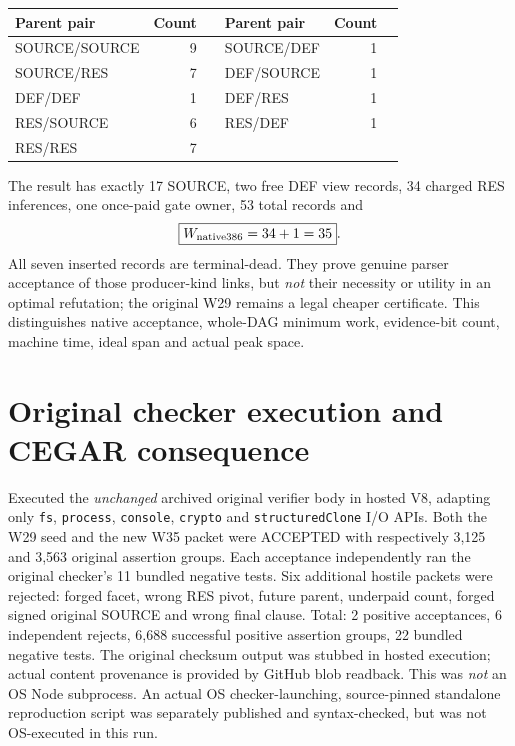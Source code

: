 \documentclass[11pt]{article}
\begin{document}
\begin{center}
\begin{tabular}{lrr@{\qquad}lrr}\toprule
Parent pair & Count & & Parent pair & Count &\\\midrule
SOURCE/SOURCE &9 && SOURCE/DEF &1&\\
SOURCE/RES &7 && DEF/SOURCE &1&\\
DEF/DEF &1 && DEF/RES &1&\\
RES/SOURCE &6 && RES/DEF &1&\\
RES/RES &7 &&&\\\bottomrule
\end{tabular}
\end{center}

The result has exactly 17 SOURCE, two free DEF view records, 34 charged RES inferences, one once-paid gate owner, 53 total records and
\[
\boxed{W_{\rm native386}=34+1=35}.
\]
All seven inserted records are terminal-dead. They prove genuine parser acceptance of those producer-kind links, but \emph{not} their necessity or utility in an optimal refutation; the original W29 remains a legal cheaper certificate. This distinguishes native acceptance, whole-DAG minimum work, evidence-bit count, machine time, ideal span and actual peak space.

\section*{Original checker execution and CEGAR consequence}
Executed the \emph{unchanged} archived original verifier body in hosted V8, adapting only \texttt{fs}, \texttt{process}, \texttt{console}, \texttt{crypto} and \texttt{structuredClone} I/O APIs. Both the W29 seed and the new W35 packet were ACCEPTED with respectively 3,125 and 3,563 original assertion groups. Each acceptance independently ran the original checker's 11 bundled negative tests. Six additional hostile packets were rejected: forged facet, wrong RES pivot, future parent, underpaid count, forged signed original SOURCE and wrong final clause. Total: 2 positive acceptances, 6 independent rejects, 6,688 successful positive assertion groups, 22 bundled negative tests. The original checksum output was stubbed in hosted execution; actual content provenance is provided by GitHub blob readback. This was \emph{not} an OS Node subprocess. An actual OS checker-launching, source-pinned standalone reproduction script was separately published and syntax-checked, but was not OS-executed in this run.
\end{document}
